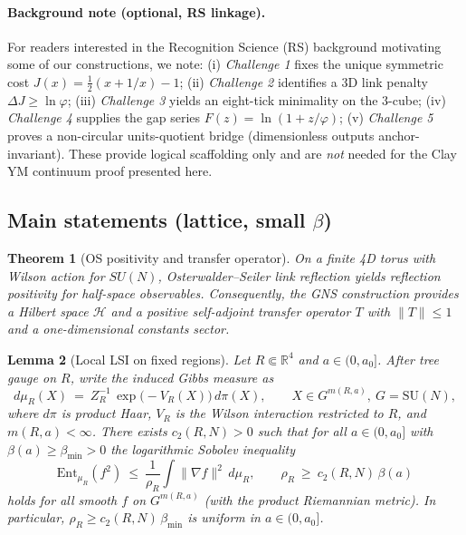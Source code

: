 \documentclass[11pt]{amsart}
\theoremstyle{plain}
\newtheorem{theorem}{Theorem}[section]
\newtheorem{lemma}[theorem]{Lemma}
\theoremstyle{definition}
\theoremstyle{remark}
\begin{document}
\paragraph{Background note (optional, RS linkage).}
For readers interested in the Recognition Science (RS) background motivating some of our constructions, we note: (i) 
\emph{Challenge 1} fixes the unique symmetric cost $J(x)=\tfrac12(x+1/x)-1$; (ii) \emph{Challenge 2} identifies a $3$D link penalty $\Delta J\ge \ln\varphi$; (iii) \emph{Challenge 3} yields an eight-tick minimality on the $3$-cube; (iv) \emph{Challenge 4} supplies the gap series $F(z)=\ln(1+z/\varphi)$; (v) \emph{Challenge 5} proves a non-circular units-quotient bridge (dimensionless outputs anchor-invariant). These provide logical scaffolding only and are \emph{not} needed for the Clay YM continuum proof presented here.

\subsection{Main statements (lattice, small $\beta$)}

\begin{theorem}[OS positivity and transfer operator] \label{thm:os}
On a finite 4D torus with Wilson action for $SU(N)$, Osterwalder--Seiler link reflection yields reflection positivity for half-space observables. Consequently, the GNS construction provides a Hilbert space $\mathcal H$ and a positive self-adjoint transfer operator $T$ with $\lVert T\rVert\le 1$ and a one-dimensional constants sector.
\end{theorem}

\begin{lemma}[Local LSI on fixed regions]\label{lem:local-lsi-fixed-region}
Let $R\Subset\mathbb R^4$ and $a\in(0,a_0]$. After tree gauge on $R$, write the induced Gibbs measure as
\[
  d\mu_R(X)\ =\ Z_R^{-1}\,\exp\big(-V_R(X)\big)\,d\pi(X),\qquad X\in G^{m(R,a)},\ G=\mathrm{SU}(N),
\]
where $d\pi$ is product Haar, $V_R$ is the Wilson interaction restricted to $R$, and $m(R,a)<\infty$. There exists $c_2(R,N)>0$ such that for all $a\in(0,a_0]$ with $\beta(a)\ge \beta_{\min}>0$ the logarithmic Sobolev inequality
\[
  \mathrm{Ent}_{\mu_R}(f^2)\ \le\ \frac{1}{\rho_R}\int \|\nabla f\|^2\,d\mu_R,\qquad \rho_R\ \ge\ c_2(R,N)\,\beta(a)
\]
holds for all smooth $f$ on $G^{m(R,a)}$ (with the product Riemannian metric). In particular, $\rho_R\ge c_2(R,N)\,\beta_{\min}$ is uniform in $a\in(0,a_0]$.
\end{lemma}
\end{document}
